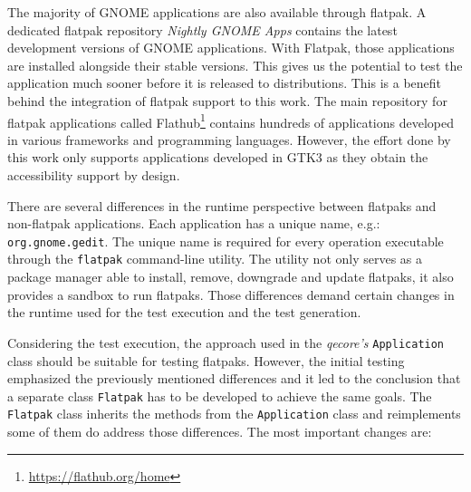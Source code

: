 The majority of GNOME applications are also available through flatpak. A dedicated flatpak repository \textit{Nightly GNOME Apps} contains the latest development versions of GNOME applications. With Flatpak, those applications are installed alongside their stable versions. This gives us the potential to test the application much sooner before it is released to distributions. This is a benefit behind the integration of flatpak support to this work. The main repository for flatpak applications called Flathub\footnote{\url{https://flathub.org/home}} contains hundreds of applications developed in various frameworks and programming languages. However, the effort done by this work only supports applications developed in GTK3 as they obtain the accessibility support by design.

There are several differences in the runtime perspective between flatpaks and non-flatpak applications. Each application has a unique name, e.g.: \texttt{org.gnome.gedit}. The unique name is required for every operation executable through the \texttt{flatpak} command-line utility. The utility not only serves as a package manager able to install, remove, downgrade and update flatpaks, it also provides a sandbox to run flatpaks. Those differences demand certain changes in the runtime used for the test execution and the test generation. 

Considering the test execution, the approach used in the \textit{qecore's} \texttt{Application} class should be suitable for testing flatpaks. However, the initial testing emphasized the previously mentioned differences and it led to the conclusion that a separate class \texttt{Flatpak} has to be developed to achieve the same goals. The \texttt{Flatpak} class inherits the methods from the \texttt{Application} class and reimplements some of them do address those differences. The most important changes are:

